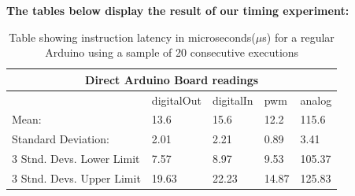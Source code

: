 \newpage
\textbf{The tables below display the result of our timing experiment: }

\begin{table}[h!]
	\caption{Table showing instruction latency in microseconds($\mu$s) for a regular Arduino using a sample of 20 consecutive executions}\label{table:arduinoboard}
	\begin{tabular}{|l|l|l|l|l|}
	\toprule
 \multicolumn{5}{c}{\textbf{Direct Arduino Board readings}} \\\hline

& digitalOut & digitalIn & pwm & analog \\\hline
Mean:                   & 13.6 & 15.6 & 12.2 & 115.6\\\hline
Standard Deviation:     & 2.01 & 2.21  & 0.89  & 3.41 \\\hline
3 Stnd. Devs. Lower Limit& 7.57 & 8.97  & 9.53  & 105.37 \\\hline
3 Stnd. Devs. Upper Limit& 19.63& 22.23 & 14.87 & 125.83 \\\hline
\end{tabular}
\end{table}

